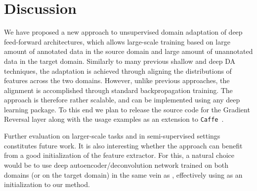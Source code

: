 \section{Discussion}

We have proposed a new approach to unsupervised domain adaptation of deep feed-forward architectures, which allows large-scale training based on large amount of annotated data in the source domain and large amount of unannotated data in the target domain. Similarly to many previous shallow and deep DA techniques, the adaptation is achieved through aligning the distributions of features across the two domains. However, unlike previous approaches, the alignment is accomplished through standard backpropagation training. The approach is therefore rather scalable, and can be implemented using any deep learning package. To this end we plan to release the source code for the Gradient Reversal layer along with the usage examples as an extension to \texttt{Caffe}~\cite{Jia14}.

Further evaluation on larger-scale tasks and in semi-supervised settings constitutes future work. It is also interesting whether the approach can benefit from a good initialization of the feature extractor. For this, a natural choice would be to use deep autoencoder/deconvolution network trained on both domains (or on the target domain) in the same vein as \cite{Glorot11,Chopra13}, effectively using \cite{Glorot11,Chopra13} as an initialization to our method.\newpage
